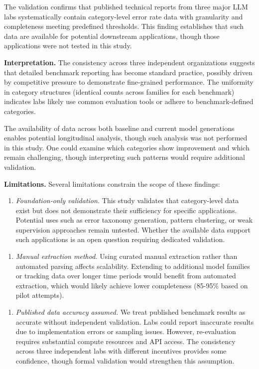 
The validation confirms that published technical reports from three major LLM labs systematically contain category-level error rate data with granularity and completeness meeting predefined thresholds. This finding establishes that such data are available for potential downstream applications, though those applications were not tested in this study.

\textbf{Interpretation.} The consistency across three independent organizations suggests that detailed benchmark reporting has become standard practice, possibly driven by competitive pressure to demonstrate fine-grained performance. The uniformity in category structures (identical counts across families for each benchmark) indicates labs likely use common evaluation tools or adhere to benchmark-defined categories.

The availability of data across both baseline and current model generations enables potential longitudinal analysis, though such analysis was not performed in this study. One could examine which categories show improvement and which remain challenging, though interpreting such patterns would require additional validation.

\textbf{Limitations.} Several limitations constrain the scope of these findings:

\begin{enumerate}
\item \textit{Foundation-only validation.} This study validates that category-level data exist but does not demonstrate their sufficiency for specific applications. Potential uses such as error taxonomy generation, pattern clustering, or weak supervision approaches remain untested. Whether the available data support such applications is an open question requiring dedicated validation.
\end{enumerate}

\begin{enumerate}
\item \textit{Manual extraction method.} Using curated manual extraction rather than automated parsing affects scalability. Extending to additional model families or tracking data over longer time periods would benefit from automated extraction, which would likely achieve lower completeness (85-95\% based on pilot attempts).
\end{enumerate}

\begin{enumerate}
\item \textit{Published data accuracy assumed.} We treat published benchmark results as accurate without independent validation. Labs could report inaccurate results due to implementation errors or sampling issues. However, re-evaluation requires substantial compute resources and API access. The consistency across three independent labs with different incentives provides some confidence, though formal validation would strengthen this assumption.
\end{enumerate}


